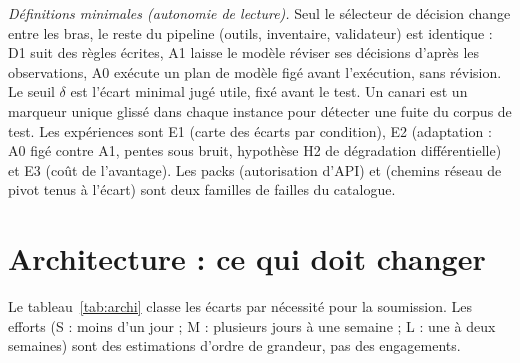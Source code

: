 \documentclass[11pt,a4paper]{article}
\newcommand{\code}[1]{{\small\ttfamily\path{#1}}}
\begin{document}
\emph{D\'efinitions minimales (autonomie de lecture).} Seul le s\'electeur de d\'ecision change entre les bras, le reste du pipeline (outils, inventaire, validateur) est identique : D1 suit des r\`egles \'ecrites, A1 laisse le mod\`ele r\'eviser ses d\'ecisions d'apr\`es les observations, A0 ex\'ecute un plan de mod\`ele fig\'e avant l'ex\'ecution, sans r\'evision. Le seuil $\delta$ est l'\'ecart minimal jug\'e utile, fix\'e avant le test. Un canari est un marqueur unique gliss\'e dans chaque instance pour d\'etecter une fuite du corpus de test. Les exp\'eriences sont E1 (carte des \'ecarts par condition), E2 (adaptation : A0 fig\'e contre A1, pentes sous bruit, hypoth\`ese H2 de d\'egradation diff\'erentielle) et E3 (co\^ut de l'avantage). Les packs \code{f11} (autorisation d'API) et \code{f20} (chemins r\'eseau de pivot tenus \`a l'\'ecart) sont deux familles de failles du catalogue.

\section{Architecture : ce qui doit changer}
\label{sec:archi}

Le tableau~\ref{tab:archi} classe les \'ecarts par n\'ecessit\'e pour la soumission. Les efforts (S : moins d'un jour ; M : plusieurs jours \`a une semaine ; L : une \`a deux semaines) sont des estimations d'ordre de grandeur, pas des engagements.
\end{document}
